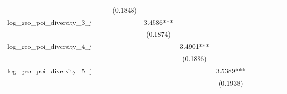 \begin{table}
\begin{center}
\begin{tabular}{lccccccccccc}
                                &                       &                        & (0.1848)                &                          &                           &                            &                             &                              &                               &                                &                                  \\
log\_geo\_poi\_diversity\_3\_j  &                       &                        &                         & 3.4586***                &                           &                            &                             &                              &                               &                                &                                  \\
                                &                       &                        &                         & (0.1874)                 &                           &                            &                             &                              &                               &                                &                                  \\
log\_geo\_poi\_diversity\_4\_j  &                       &                        &                         &                          & 3.4901***                 &                            &                             &                              &                               &                                &                                  \\
                                &                       &                        &                         &                          & (0.1886)                  &                            &                             &                              &                               &                                &                                  \\
log\_geo\_poi\_diversity\_5\_j  &                       &                        &                         &                          &                           & 3.5389***                  &                             &                              &                               &                                &                                  \\
                                &                       &                        &                         &                          &                           & (0.1938)                   &                             &                              &                               &                                &                                  \\

\end{tabular}
\end{center}
\end{table}
